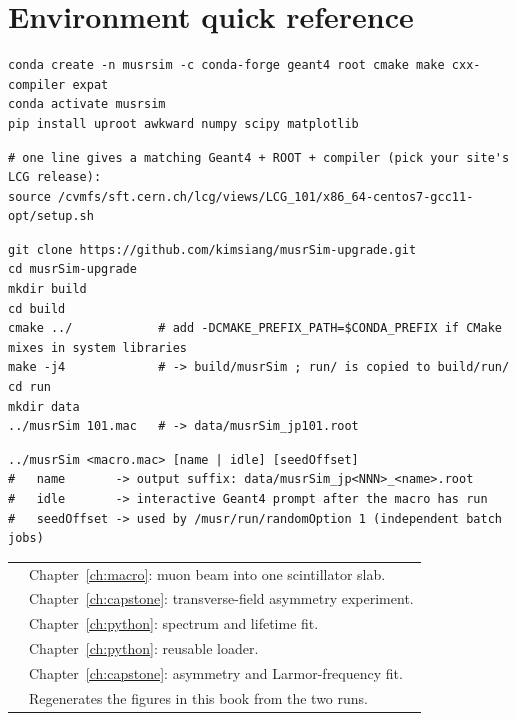 \chapter{Environment quick reference}
\label{app:env}

\begin{lstlisting}[style=sh]
conda create -n musrsim -c conda-forge geant4 root cmake make cxx-compiler expat
conda activate musrsim
pip install uproot awkward numpy scipy matplotlib
\end{lstlisting}

\begin{lstlisting}[style=sh]
# one line gives a matching Geant4 + ROOT + compiler (pick your site's LCG release):
source /cvmfs/sft.cern.ch/lcg/views/LCG_101/x86_64-centos7-gcc11-opt/setup.sh
\end{lstlisting}

\begin{lstlisting}[style=sh]
git clone https://github.com/kimsiang/musrSim-upgrade.git
cd musrSim-upgrade
mkdir build
cd build
cmake ../            # add -DCMAKE_PREFIX_PATH=$CONDA_PREFIX if CMake mixes in system libraries
make -j4             # -> build/musrSim ; run/ is copied to build/run/
cd run
mkdir data
../musrSim 101.mac   # -> data/musrSim_jp101.root
\end{lstlisting}

\begin{lstlisting}[style=sh]
../musrSim <macro.mac> [name | idle] [seedOffset]
#   name       -> output suffix: data/musrSim_jp<NNN>_<name>.root
#   idle       -> interactive Geant4 prompt after the macro has run
#   seedOffset -> used by /musr/run/randomOption 1 (independent batch jobs)
\end{lstlisting}

{\tablestyle
\begin{tabularx}{\textwidth}{@{}>{\raggedright\arraybackslash}p{} L@{}}
\toprule
{} & Chapter~\ref{ch:macro}: muon beam into one scintillator slab.\\
 & Chapter~\ref{ch:capstone}: transverse-field asymmetry experiment.\\
 & Chapter~\ref{ch:python}: spectrum and lifetime fit.\\
 & Chapter~\ref{ch:python}: reusable loader.\\
 & Chapter~\ref{ch:capstone}: asymmetry and Larmor-frequency fit.\\
 & Regenerates the figures in this book from the two runs.\\
\bottomrule
\end{tabularx}}

